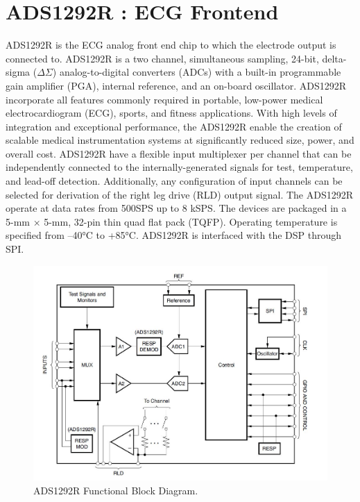 \section{ADS1292R : ECG Frontend}
ADS1292R is the ECG analog front end chip to which the electrode output is connected to. ADS1292R is a two channel, simultaneous sampling, 24-bit, delta-sigma ($\Delta$$\Sigma$) analog-to-digital converters (ADCs) with a built-in programmable gain amplifier (PGA), internal reference, and an on-board oscillator. ADS1292R incorporate all features commonly required in portable, low-power medical electrocardiogram (ECG), sports, and fitness applications. With high levels of integration and exceptional performance, the ADS1292R enable the creation of scalable medical instrumentation systems at significantly reduced size, power, and overall cost. ADS1292R have a flexible input multiplexer per channel that can be independently connected to the internally-generated signals for test, temperature, and lead-off detection. Additionally, any configuration of input channels can be selected for derivation of the right leg drive (RLD) output signal. The ADS1292R operate at data rates from 500SPS up to 8 kSPS. The devices are packaged in a 5-mm × 5-mm, 32-pin thin quad flat pack (TQFP). Operating temperature is specified from –40°C to +85°C. ADS1292R is interfaced with the DSP through SPI.
 \begin{figure}[h]
 	\centering
 	\includegraphics[scale = 0.7 ]{ADS1292R.JPG}
 	\caption{ADS1292R Functional Block Diagram. \cite{ads}\label{ADS1292R}}
 \end{figure}
 
